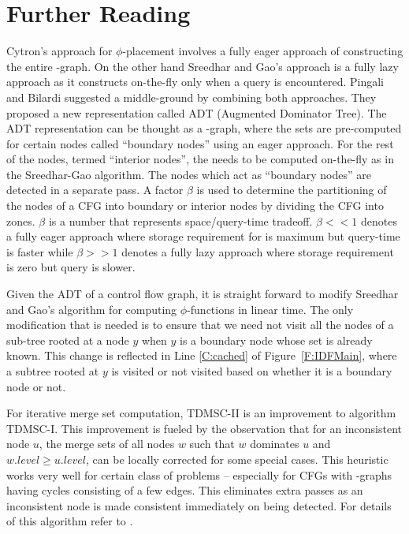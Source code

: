 {\section{Further Reading}
Cytron's approach for $\phi$-placement involves a fully eager approach of constructing the entire \DF-graph. On the other hand Sreedhar and Gao's approach is a fully lazy approach as it constructs \DF on-the-fly only when a query is encountered.
Pingali and Bilardi \cite{bilardi} suggested a middle-ground by combining both approaches. They proposed a new representation called ADT (Augmented Dominator Tree). The ADT representation can be thought as a \DJ-graph, where the \DF sets are pre-computed for certain nodes called ``boundary nodes'' using an eager approach. For the rest of the nodes, termed ``interior nodes'', the \DF needs to be computed on-the-fly as in the Sreedhar-Gao algorithm. The nodes which act as ``boundary nodes'' are detected in a separate pass. A factor $\beta$ is used to determine the partitioning of the nodes of a CFG into boundary or interior nodes by dividing the CFG into zones. $\beta$ is a number that represents space/query-time tradeoff. $\beta << 1$ denotes a fully eager approach where storage requirement for \DF is maximum but query-time is faster while $\beta >> 1$ denotes a fully lazy approach where storage requirement is zero but query is slower. 

Given the ADT of a control flow graph, it is straight forward to 
modify  Sreedhar and Gao's algorithm for computing $\phi$-functions in linear time. The only modification that is needed is to ensure that we need not visit all the nodes of a sub-tree rooted at a node $y$ when $y$ is a boundary node whose \DF set is already known. This change is reflected in Line \ref{C:cached} of Figure~\ref{F:IDFMain}, where a subtree rooted at $y$ is visited or not visited based on whether it is a boundary node or not.

For iterative merge set computation, TDMSC-II is an improvement to algorithm TDMSC-I. This improvement is fueled by the observation that for an inconsistent node $u$, the merge sets of all nodes $w$ such that $w$ dominates $u$ and $w.level \geq u.level$,
can be locally corrected for some special cases. This
heuristic works very well for certain class of problems -- especially for CFGs with \DF-graphs having cycles consisting of a few edges. This eliminates extra passes as an inconsistent node is made consistent immediately on being detected. For details of this algorithm refer to \cite{das}.


}
